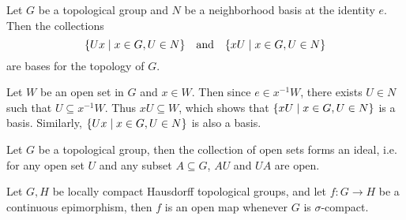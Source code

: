 \begin{prop}
    Let $G$ be a topological group and $N$ be a neighborhood basis at the identity $e$. Then the collections
    \[
    {\left\{{Ux \mid x \in G, U \in N}\right\}} \quad \text{and} \quad {\left\{{xU \mid x \in G, U \in N}\right\}}
    \]
    are bases for the topology of $G$.
    \begin{prop}
        Let $W$ be an open set in $G$ and $x \in W$. Then since $e \in x^{-1}W$, there exists $U \in N$ such that $U \subseteq x^{-1}W$. Thus $xU \subseteq W$, which shows that ${\left\{{xU \mid x \in G, U \in N}\right\}}$ is a basis. Similarly, ${\left\{{Ux \mid x \in G, U \in N}\right\}}$ is also a basis.
    \end{prop}
\end{prop}

\begin{prop}
    Let $G$ be a topological group, then the collection of open sets forms an ideal, i.e. for any open set $U$ and any subset $A \subseteq G$, $AU$ and $UA$ are open.
\end{prop}

\begin{thm}
    Let $G, H$ be locally compact Hausdorff topological groups, and let $f: G \to H$ be a continuous epimorphism, then $f$ is an open map whenever $G$ is $\sigma$-compact.
\end{thm}